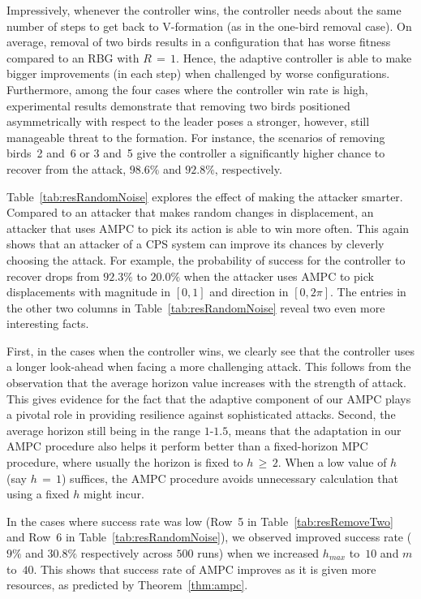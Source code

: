 Impressively, whenever the controller wins, the controller needs about the same number of steps to get back to V-formation (as in the one-bird removal case). On average, removal of two birds results in a configuration that has worse fitness compared to an RBG with $R\,{=}\,1$. %
Hence, the adaptive controller is able to make bigger improvements (in each step) when challenged by worse configurations. Furthermore, among the four cases where the controller win rate is high, experimental results demonstrate that removing two birds positioned asymmetrically with respect to the leader poses a stronger, however, still manageable threat to the formation. For instance, the scenarios of removing birds~2 and~6 or 3 and~5 give the controller a significantly higher chance to recover from the attack, $98.6\%$ and $92.8\%$, respectively.

Table~\ref{tab:resRandomNoise} explores the effect of making the attacker smarter. Compared to an attacker that makes random changes in displacement, an attacker that uses AMPC to pick its action is able to win more often. This again shows that an attacker of a CPS system can improve its chances by cleverly choosing the attack. For example, the probability of success for the controller to recover drops from $92.3\%$ to $20.0\%$ when the attacker uses AMPC to pick displacements with magnitude in $[0,1]$ and direction in $[0,2\pi]$. The entries in the other two columns in Table~\ref{tab:resRandomNoise} reveal two even more interesting facts.

First, in the cases when the controller wins, we clearly see that the controller uses a longer look-ahead when facing a more challenging attack. This follows from the observation that the average horizon value increases with the strength of attack. This gives evidence for the fact that the adaptive component of our AMPC plays a pivotal role in providing resilience against sophisticated attacks.
Second, the average horizon still being in the range $1$-$1.5$, means that the adaptation in our AMPC procedure also helps it perform better than a fixed-horizon MPC procedure, where usually the horizon is fixed to $h\,{\geqslant}\,2$.
When a low value of $h$ (say $h\,{=}\,1$) suffices, the AMPC procedure avoids unnecessary calculation that using a fixed $h$ might incur.

In the cases where success rate was low (Row~5 in Table~\ref{tab:resRemoveTwo} and Row~6 in Table~\ref{tab:resRandomNoise}), we observed improved success rate ($9\%$ and $30.8\%$ respectively across $500$ runs) when we increased $h_{\mathit{max}}$ to~$10$ and $m$ to~$40$. This shows that success rate of AMPC improves as it is given more resources, as predicted by Theorem~\ref{thm:ampc}.



